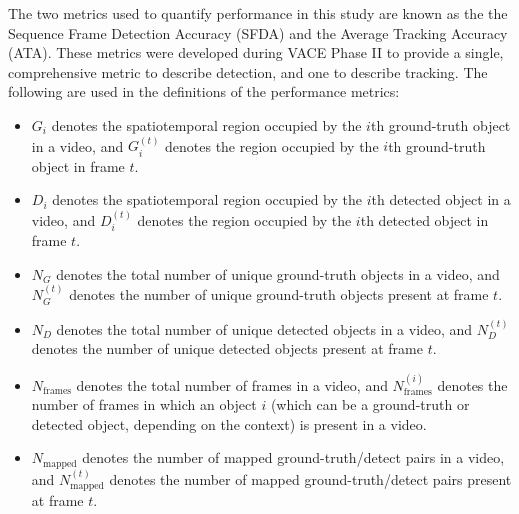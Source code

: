 \documentclass[twocolumn, final]{svjour3}
\begin{document}
The two metrics used to quantify performance in this study are known as the the Sequence Frame Detection Accuracy (SFDA) and the Average Tracking Accuracy (ATA). These metrics were developed during VACE Phase II to provide a single, comprehensive metric to describe detection, and one to describe tracking. The following are used in the definitions of the performance metrics:
\begin{itemize}
\renewcommand{\labelitemi}{$\bullet$}
\item $G_{i}$ denotes the spatiotemporal region occupied by the $i$th ground-truth object in a video, and $G_{i}^{(t)}$ denotes the region occupied by the $i$th ground-truth object in frame $t$.
\vspace{2mm}
\item $D_{i}$ denotes the spatiotemporal region occupied by the $i$th detected object in a video, and $D_{i}^{(t)}$ denotes the region occupied by the $i$th detected object in frame $t$.
\vspace{2mm}
\item $N_{G}$ denotes the total number of unique ground-truth objects in a video, and $N_{G}^{(t)}$ denotes the number of unique ground-truth objects present at frame $t$.
\vspace{2mm}
\item $N_{D}$ denotes the total number of unique detected objects in a video, and $N_{D}^{(t)}$ denotes the number of unique detected objects present at frame $t$.
\vspace{2mm}
\item $N_{\text{frames}}$ denotes the total number of frames in a video, and $N_{\text{frames}}^{(i)}$ denotes the number of frames in which an object $i$ (which can be a ground-truth or detected object, depending on the context) is present in a video.
\vspace{2mm}
\item $N_{\text{mapped}}$ denotes the number of mapped ground-truth/detect pairs in a video, and $N_{\text{mapped}}^{(t)}$ denotes the number of mapped ground-truth/detect pairs present at frame $t$.
\vspace{1mm}
\end{itemize}
\end{document}
